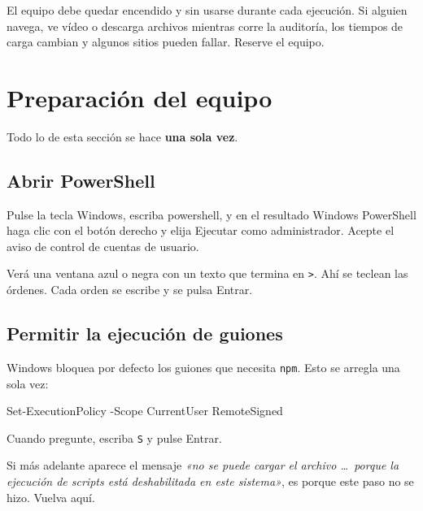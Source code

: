 \documentclass[11pt,a4paper]{article}
\begin{document}
\begin{aviso}
	El equipo debe quedar encendido y sin usarse durante cada ejecución. Si alguien navega, ve vídeo o descarga archivos mientras corre la auditoría, los tiempos de carga cambian y algunos sitios pueden fallar. Reserve el equipo.
\end{aviso}

\section{Preparación del equipo}\label{sec:preparar}

Todo lo de esta sección se hace \textbf{una sola vez}.

\subsection{Abrir PowerShell}

Pulse la tecla \textsf{Windows}, escriba \textsf{powershell}, y en el resultado \textsf{Windows PowerShell} haga clic con el botón derecho y elija \textsf{Ejecutar como administrador}. Acepte el aviso de control de cuentas de usuario.

Verá una ventana azul o negra con un texto que termina en \texttt{>}. Ahí se teclean las órdenes. Cada orden se escribe y se pulsa \textsf{Entrar}.

\subsection{Permitir la ejecución de guiones}\label{sub:scripts}

Windows bloquea por defecto los guiones que necesita \texttt{npm}. Esto se arregla una sola vez:

\begin{orden}
Set-ExecutionPolicy -Scope CurrentUser RemoteSigned
\end{orden}

Cuando pregunte, escriba \texttt{S} y pulse \textsf{Entrar}.

\begin{aviso}
	Si más adelante aparece el mensaje \textit{«no se puede cargar el archivo \dots\ porque la ejecución de scripts está deshabilitada en este sistema»}, es porque este paso no se hizo. Vuelva aquí.
\end{aviso}
\end{document}
